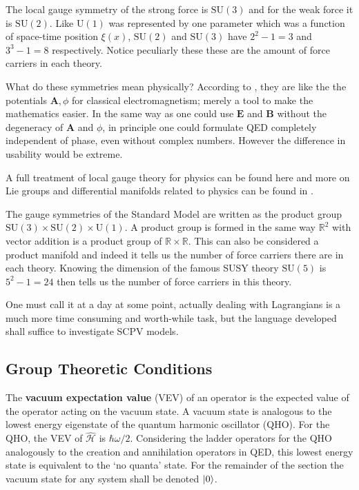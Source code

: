 The local gauge symmetry of the strong force is $\mathrm{SU}(3)$ and for the weak force it is $\mathrm{SU}(2)$. Like $\mathrm{U}(1)$ was represented by one parameter which was a function of space-time position $\xi(x)$, $\mathrm{SU}(2)$ and $\mathrm{SU}(3)$ have $2^2-1=3$ and $3^3-1=8$ respectively. Notice peculiarly these these are the amount of force carriers in each theory.

What do these symmetries mean physically? According to \cite{SCPV6}, they are like the the potentials $\mathbf{A}, \phi$ for classical electromagnetism; merely a tool to make the mathematics easier. In the same way as one could use $\mathbf{E}$ and $\mathbf{B}$ without the degeneracy of $\mathbf{A}$ and $\phi$, in principle one could formulate QED completely independent of phase, even without complex numbers.
However the difference in usability would be extreme.


A full treatment of local gauge theory for physics can be found here \cite{SCPV6} and more on Lie groups and differential manifolds related to physics can be found in \cite{SCPV3}.

The gauge symmetries of the Standard Model are written as the product group $\mathrm{SU}(3)\times \mathrm{SU}(2)\times \mathrm{U}(1)$. A product group is formed in the same way $\mathbb{R}^2$ with vector addition is a product group of $\mathbb{R}\times\mathbb{R}$. This can also be considered a product manifold and indeed it tells us the number of force carriers there are in each theory. Knowing the dimension of the famous SUSY theory $\mathrm{SU}(5)$ is $5^2-1 = 24$ then tells us the number of force carriers in this theory.

One must call it at a day at some point, actually dealing with Lagrangians is a much more time consuming and worth-while task, but the language developed shall suffice to investigate SCPV models.

\subsection{Group Theoretic Conditions}
The \textbf{vacuum expectation value} (VEV) of an operator is the expected value of the operator acting on the vacuum state. A vacuum state is analogous to the lowest energy eigenstate of the quantum harmonic oscillator (QHO). For the QHO, the VEV of $\hat{\mathcal{H}}$ is $\hbar \omega /2$. Considering the ladder operators for the QHO analogously to the creation and annihilation operators in QED, this lowest energy state is equivalent to the `no quanta' state. For the remainder of the section the vacuum state for any system shall be denoted $\ket{0}$.

